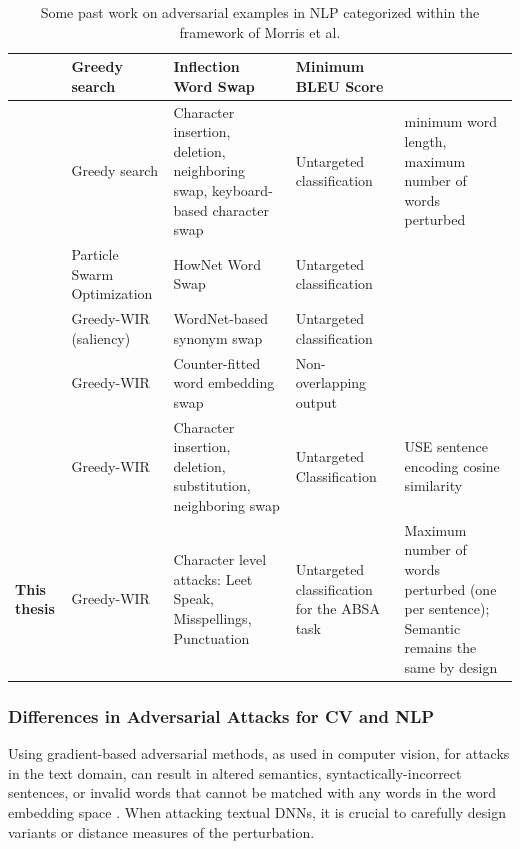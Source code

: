 \begin{table}[t]
\begin{adjustwidth}{-0cm}{}
\small
\begin{tabular}{p{2cm}|p{2cm}p{3cm}p{2cm}p{4cm}}


\midrule
\textbf{\cite{tan2020s}}&Greedy search &Inflection Word Swap &Minimum BLEU Score & \\
\midrule
\textbf{\cite{pruthi2019combating}} &Greedy search &Character insertion, deletion, neighboring swap, keyboard-based character swap &Untargeted classification &minimum word length, maximum number of words perturbed \\
\midrule
\textbf{\cite{zang2020word}} &Particle Swarm Optimization&HowNet Word Swap &Untargeted classification & \\
\midrule
\textbf{\cite{ren2019generating}} &Greedy-WIR (saliency) &WordNet-based synonym swap &Untargeted classification & \\
\midrule
\textbf{\cite{cheng2020seq2sick}} &Greedy-WIR &Counter-fitted word embedding swap &Non-overlapping output & \\
\midrule
\textbf{\cite{li2018textbugger}} &Greedy-WIR &Character insertion, deletion, substitution, neighboring swap&Untargeted Classification &USE sentence encoding cosine similarity \\
\midrule
\textbf{This thesis} &Greedy-WIR &Character level attacks: Leet Speak, Misspellings, Punctuation &Untargeted classification for the ABSA task &Maximum number of words perturbed (one per sentence); Semantic remains the same by design \\
\bottomrule
\end{tabular}
\end{adjustwidth}
\caption[Past work on adversarial examples in NLP]{Some past work on adversarial examples in NLP categorized within the framework of Morris et al.}
\label{tab:loooong}
\end{table}

\subsubsection{Differences in Adversarial Attacks for CV and NLP }
\label{sec:differences_in_adv-ex}

Using gradient-based adversarial methods, as used in computer vision, for attacks in the text domain, can result in altered semantics, syntactically-incorrect sentences, or invalid words that cannot be matched with any words in the word embedding space \cite{zhang2019adversarial}. When attacking textual DNNs, it is crucial to carefully design variants or distance measures of the perturbation.

